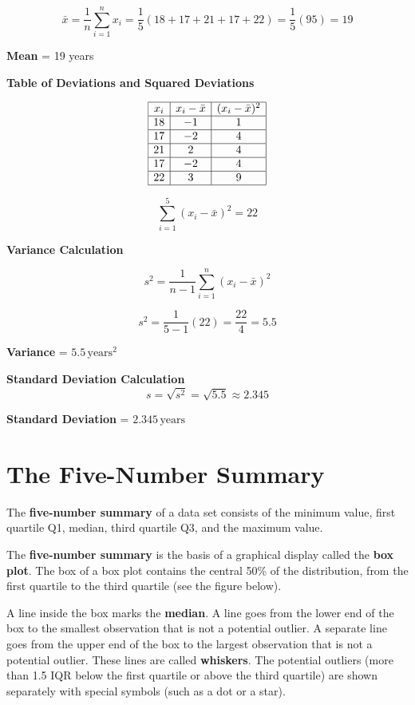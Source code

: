 \[
\bar{x} = \frac{1}{n} \sum_{i=1}^{n} x_i = \frac{1}{5} (18 + 17 + 21 + 17 + 22) = \frac{1}{5} (95) = 19
\]

\textbf{Mean} = 19 years

\vspace{0.2cm}

\textbf{Table of Deviations and Squared Deviations}

\[
\begin{array}{|c|c|c|}
\hline
x_i & x_i - \bar{x} & (x_i - \bar{x})^2 \\ \hline
18 & -1 & 1 \\ \hline
17 & -2 & 4 \\ \hline
21 & 2 & 4 \\ \hline
17 & -2 & 4 \\ \hline
22 & 3 & 9 \\ \hline
\end{array}
\]

\[
\sum_{i=1}^{5} (x_i - \bar{x})^2 = 22
\]

\vspace{0.2cm}

\textbf{Variance Calculation}

\[
s^2 = \frac{1}{n-1} \sum_{i=1}^{n} (x_i - \bar{x})^2
\]

\[
s^2 = \frac{1}{5-1} (22) = \frac{22}{4} = 5.5
\]

\textbf{Variance} = \( 5.5 \, \text{years}^2 \)

\vspace{0.2cm}

\textbf{Standard Deviation Calculation}
\[
s = \sqrt{s^2} = \sqrt{5.5} \approx 2.345
\]

\textbf{Standard Deviation} = \( 2.345 \, \text{years} \)

\section{The Five-Number Summary}
The \textbf{five-number summary} of a data set consists of the minimum value, first quartile Q1, 
median, third quartile Q3, and the maximum value.

The \textbf{five-number summary} is the basis of a graphical display called the \textbf{box 
plot}. The box of a box plot contains the central 50\% of the distribution, from the 
first quartile to the third quartile (see the figure below). 

A line inside the box marks the \textbf{median}. A line goes from the lower end of the box to the smallest observation that is not a potential outlier. A separate line goes from the upper end of the box to the largest observation that is not a potential outlier. These lines are called \textbf{whiskers}. The potential outliers (more than 1.5 IQR below the first quartile or above the third quartile) are shown separately with special symbols (such as a dot or a star).

